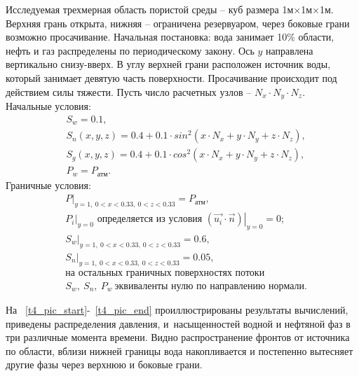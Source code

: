 Исследуемая трехмерная область пористой среды -- куб размера 1м$\times$1м$\times$1м.
Верхняя грань открыта, нижняя -- ограничена резервуаром, через боковые грани
возможно просачивание.
Начальная постановка: вода занимает 10\% области,
нефть и газ распределены по периодическому закону. Ось $y$ направлена вертикально снизу-вверх.
В углу верхней грани расположен источник воды, который занимает девятую часть поверхности. Просачивание происходит под действием силы тяжести. 
Пусть число расчетных узлов -- $N_x\cdot N_y\cdot N_z$.\\
Начальные условия:
\begin{equation}
  \begin{aligned}
    &S_w=0.1,\\
    &S_n(x, y, z)=0.4 + 0.1 \cdot sin^2(x \cdot N_x + y \cdot N_y + z \cdot N_z),\\
    &S_g(x, y, z)=0.4 + 0.1 \cdot cos^2(x \cdot N_x + y \cdot N_y + z \cdot N_z),\\
    &P_w=P_\text{атм}.
   \end{aligned}
\end{equation}
Граничные условия:
\begin{equation}
  \begin{aligned}
    &\left.P\right|_{y=1,\ 0 < x < 0.33,\ 0 < z < 0.33}=P_{\text{атм}},\\
    &\left.{P_i}\right|_{y=0}\text{ определяется из условия } \left.(\overrightarrow{u_i} \cdot \overrightarrow{n})\right|_{y=0}=0;\\
    &\left.S_w\right|_{y=1,\ 0 < x < 0.33,\ 0 < z < 0.33}=0.6,\\
    &\left.S_n\right|_{y=1,\ 0 < x < 0.33,\ 0 < z < 0.33}=0.05,\\
    &\text{на остальных граничных поверхностях потоки}\\
    &S_w,\ S_n,\ P_w\ \text{эквиваленты нулю по направлению нормали.}
  \end{aligned}
\end{equation}

На ~\ref{t4_pic_start}-~\ref{t4_pic_end} проиллюстрированы результаты вычислений, приведены распределения давления,
и~насыщенностей водной и нефтяной фаз в три различные момента времени. Видно распространение фронтов от источника по области, вблизи нижней границы вода накопливается и постепенно вытесняет другие фазы через верхнюю и боковые грани.

